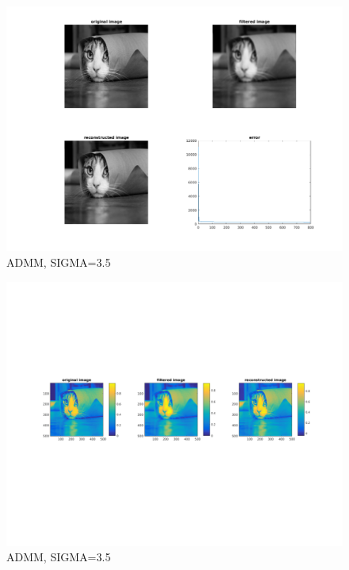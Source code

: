 \documentclass[a4paper, UTF8]{ctexrep}
\begin{document}
			\begin{figure}[h]
				\centering
				\includegraphics[width=\textwidth]{hw4_fig3.png}
				\caption{ADMM, SIGMA=3.5}
				\label{fig:figure1}
			\end{figure}
			\clearpage
			\begin{figure}[h]
				\centering
				\includegraphics[width=\textwidth]{hw4_fig4.png}
				\caption{ADMM, SIGMA=3.5}
				\label{fig:figure1}
			\end{figure}
			\clearpage
\end{document}
